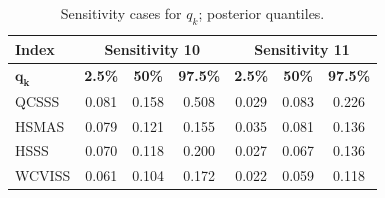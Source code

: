\documentclass[11pt]{book}\usepackage[]{graphicx}\usepackage[]{color}
\newcommand{\subscr}[1]{$_{\text{#1}}$}
\begin{document}
\begin{table}[H]
\centering
\caption{\label{tab:sensitivities-q}Sensitivity cases for $q_k$; posterior quantiles.}
\begin{tabular}{lcccccc}
\hline
\textbf{Index}  & \multicolumn{3}{c}{\textbf{Sensitivity 10}} & \multicolumn{3}{c}{\textbf{Sensitivity 11}} \\
\hline
 $\mathbf{q_k}$ & \textbf{2.5\%} & \textbf{50\%} & \textbf{97.5\%} & \textbf{2.5\%} & \textbf{50\%} & \textbf{97.5\%} \\
\hline
QCSSS  & 0.081 & 0.158 & 0.508 & 0.029 & 0.083 & 0.226 \\
HSMAS  & 0.079 & 0.121 & 0.155 & 0.035 & 0.081 & 0.136 \\
HSSS   & 0.070 & 0.118 & 0.200 & 0.027 & 0.067 & 0.136 \\
WCVISS & 0.061 & 0.104 & 0.172 & 0.022 & 0.059 & 0.118 \\
\hline
\end{tabular}
\end{table}

\end{document}
